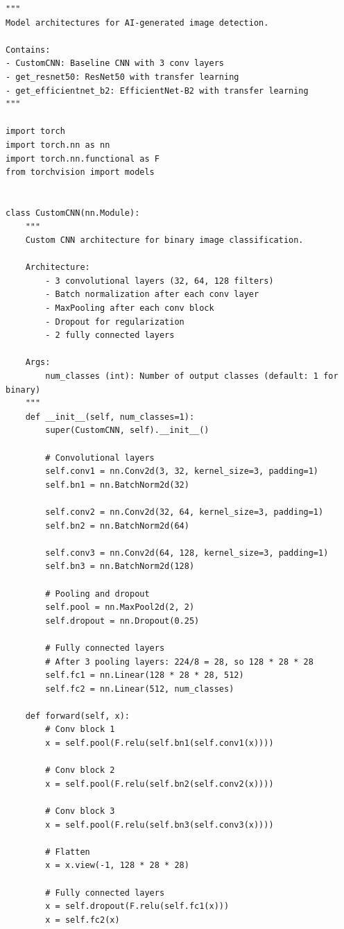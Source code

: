 \documentclass[man,12pt,letterpaper,donotrepeattitle,floatsintext]{apa7}
\begin{document}
\begin{lstlisting}[style=pythonstyle]
"""
Model architectures for AI-generated image detection.

Contains:
- CustomCNN: Baseline CNN with 3 conv layers
- get_resnet50: ResNet50 with transfer learning
- get_efficientnet_b2: EfficientNet-B2 with transfer learning
"""

import torch
import torch.nn as nn
import torch.nn.functional as F
from torchvision import models


class CustomCNN(nn.Module):
    """
    Custom CNN architecture for binary image classification.
    
    Architecture:
        - 3 convolutional layers (32, 64, 128 filters)
        - Batch normalization after each conv layer
        - MaxPooling after each conv block
        - Dropout for regularization
        - 2 fully connected layers
    
    Args:
        num_classes (int): Number of output classes (default: 1 for binary)
    """
    def __init__(self, num_classes=1):
        super(CustomCNN, self).__init__()
        
        # Convolutional layers
        self.conv1 = nn.Conv2d(3, 32, kernel_size=3, padding=1)
        self.bn1 = nn.BatchNorm2d(32)
        
        self.conv2 = nn.Conv2d(32, 64, kernel_size=3, padding=1)
        self.bn2 = nn.BatchNorm2d(64)
        
        self.conv3 = nn.Conv2d(64, 128, kernel_size=3, padding=1)
        self.bn3 = nn.BatchNorm2d(128)
        
        # Pooling and dropout
        self.pool = nn.MaxPool2d(2, 2)
        self.dropout = nn.Dropout(0.25)
        
        # Fully connected layers
        # After 3 pooling layers: 224/8 = 28, so 128 * 28 * 28
        self.fc1 = nn.Linear(128 * 28 * 28, 512)
        self.fc2 = nn.Linear(512, num_classes)
    
    def forward(self, x):
        # Conv block 1
        x = self.pool(F.relu(self.bn1(self.conv1(x))))
        
        # Conv block 2
        x = self.pool(F.relu(self.bn2(self.conv2(x))))
        
        # Conv block 3
        x = self.pool(F.relu(self.bn3(self.conv3(x))))
        
        # Flatten
        x = x.view(-1, 128 * 28 * 28)
        
        # Fully connected layers
        x = self.dropout(F.relu(self.fc1(x)))
        x = self.fc2(x)
        

\end{lstlisting}
\end{document}
